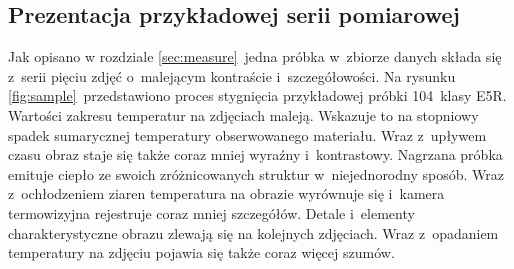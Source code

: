 \subsection{Prezentacja przykładowej serii pomiarowej}
Jak opisano w rozdziale \ref{sec:measure}~jedna próbka w~zbiorze danych składa
się z~serii pięciu zdjęć o~malejącym kontraście i~szczegółowości.
Na rysunku \ref{fig:sample}~przedstawiono proces stygnięcia przykładowej
próbki 104~klasy E5R.
Wartości zakresu temperatur na zdjęciach maleją.
Wskazuje to na stopniowy spadek sumarycznej temperatury obserwowanego materiału.
Wraz z~upływem czasu obraz staje się także coraz mniej wyraźny i~kontrastowy.
Nagrzana próbka emituje ciepło ze swoich zróżnicowanych struktur w~niejednorodny
sposób.
Wraz z~ochłodzeniem ziaren temperatura na obrazie wyrównuje się i~kamera
termowizyjna rejestruje coraz mniej szczegółów.
Detale i~elementy charakterystyczne obrazu zlewają się na kolejnych zdjęciach.
Wraz z~opadaniem temperatury na zdjęciu pojawia się także coraz więcej szumów.
